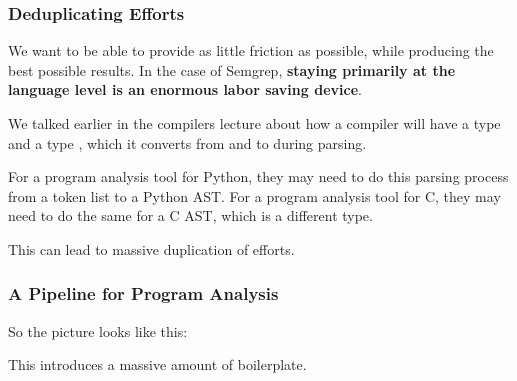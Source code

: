 \documentclass[aspectratio=169, handout]{beamer}
\begin{document}
\begin{frame}[fragile]
  \frametitle{Deduplicating Efforts}

  We want to be able to provide as little friction as possible, while producing
  the best possible results. In the case of Semgrep, \textbf{staying primarily
  at the language level is an enormous labor saving device}.

  \pause
  \vspace{\fill}

  We talked earlier in the compilers lecture about how a compiler will have a
  type  and a type , which it converts from and to
  during parsing.

  \pause
  \vspace{\fill}

  For a program analysis tool for Python, they may need to do this
  parsing process from a token list to a Python AST. For a program analysis
  tool for C, they may need to do the same for a C AST, which is a different
  type.

  \pause
  \vspace{\fill}

  This can lead to massive duplication of efforts.
\end{frame}

\begin{frame}[fragile]
  \frametitle{A Pipeline for Program Analysis}

  So the picture looks like this:

  \begin{center}
  \end{center}

  \pause
  \vspace{\fill}

  This introduces a massive amount of boilerplate.
\end{frame}
\end{document}
